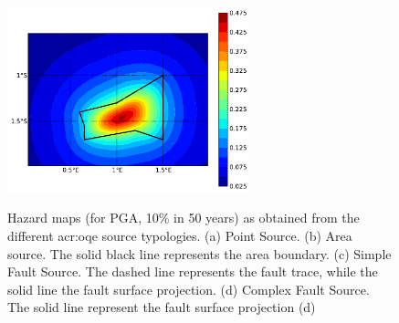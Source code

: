 \begin{figure}
\subcaptionbox{}
{\includegraphics[width=7cm]{figures/hazard/complex_fault.pdf}} 
\caption{Hazard maps (for PGA, 10\% in 50 years) as obtained from the 
    different \gls{acr:oqe} source typologies. (a) Point Source. (b) Area 
    source.  The solid black line represents the area boundary. (c) Simple 
    Fault Source. 
    The dashed line represents the fault trace, while the solid line the fault
    surface projection. (d) Complex Fault Source. The solid line represent the 
    fault surface projection (d)}
\label{fig:hazard_maps1}
\end{figure}

